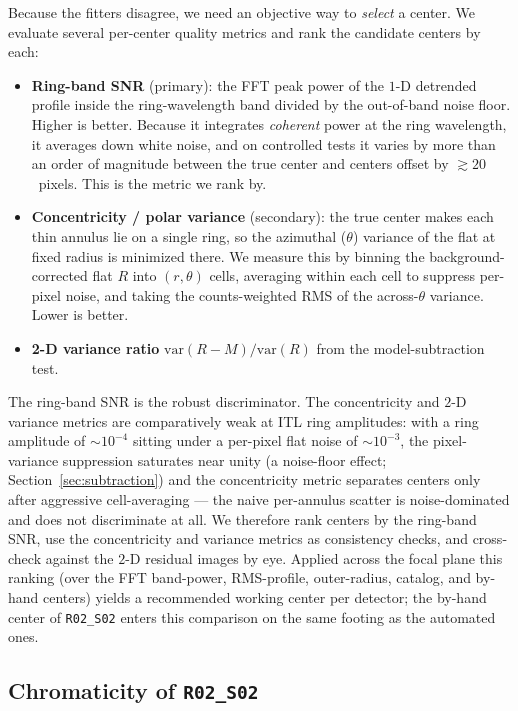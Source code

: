 Because the fitters disagree, we need an objective way to \emph{select} a center. We evaluate
several per-center quality metrics and rank the candidate centers by each:
%
\begin{itemize}
\item \textbf{Ring-band SNR} (primary): the FFT peak power of the $1$-D detrended profile inside
the ring-wavelength band divided by the out-of-band noise floor. Higher is better. Because it
integrates \emph{coherent} power at the ring wavelength, it averages down white noise, and on
controlled tests it varies by more than an order of magnitude between the true center and centers
offset by $\gtrsim20$~pixels. This is the metric we rank by.
\item \textbf{Concentricity / polar variance} (secondary): the true center makes each thin
annulus lie on a single ring, so the azimuthal ($\theta$) variance of the flat at fixed radius is
minimized there. We measure this by binning the background-corrected flat $R$ into $(r,\theta)$
cells, averaging within each cell to suppress per-pixel noise, and taking the counts-weighted RMS
of the across-$\theta$ variance. Lower is better.
\item \textbf{2-D variance ratio} $\mathrm{var}(R-M)/\mathrm{var}(R)$ from the model-subtraction
test.
\end{itemize}
%
The ring-band SNR is the robust discriminator. The concentricity and $2$-D variance metrics are
comparatively weak at \lsstcam{} ITL ring amplitudes: with a ring amplitude of $\sim\!10^{-4}$
sitting under a per-pixel flat noise of $\sim\!10^{-3}$, the pixel-variance suppression saturates
near unity (a noise-floor effect; Section~\ref{sec:subtraction}) and the concentricity metric
separates centers only after aggressive cell-averaging — the naive per-annulus scatter is
noise-dominated and does not discriminate at all. We therefore rank centers by the ring-band SNR,
use the concentricity and variance metrics as consistency checks, and cross-check against the
$2$-D residual images by eye. Applied across the focal plane this ranking (over the FFT
band-power, RMS-profile, outer-radius, catalog, and by-hand centers) yields a recommended working
center per detector; the by-hand center of \texttt{R02\_S02} enters this comparison on the same
footing as the automated ones.

\subsection{Chromaticity of \texttt{R02\_S02}} \label{sec:chromaticity}

